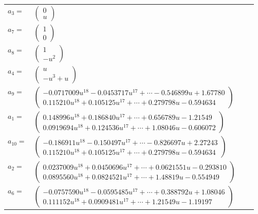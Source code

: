 \documentclass[1p]{elsarticle_modified}
\theoremstyle{definition}
\begin{document}
\begin{tabular}{m{7pt} m{180pt} m{7pt} m{180pt} }
\flushright $a_{3}=$&$\begin{pmatrix}0\\u\end{pmatrix}$ \\
\flushright $a_{7}=$&$\begin{pmatrix}1\\0\end{pmatrix}$ \\
\flushright $a_{8}=$&$\begin{pmatrix}1\\- u^2\end{pmatrix}$ \\
\flushright $a_{4}=$&$\begin{pmatrix}u\\- u^3+u\end{pmatrix}$ \\
\flushright $a_{9}=$&$\begin{pmatrix}-0.0717009 u^{18}-0.0453717 u^{17}+\cdots-0.546899 u+1.67780\\0.115210 u^{18}+0.105125 u^{17}+\cdots+0.279798 u-0.594634\end{pmatrix}$ \\
\flushright $a_{1}=$&$\begin{pmatrix}0.148996 u^{18}+0.186840 u^{17}+\cdots+0.656789 u-1.21549\\0.0919694 u^{18}+0.124536 u^{17}+\cdots+1.08046 u-0.606072\end{pmatrix}$ \\
\flushright $a_{10}=$&$\begin{pmatrix}-0.186911 u^{18}-0.150497 u^{17}+\cdots-0.826697 u+2.27243\\0.115210 u^{18}+0.105125 u^{17}+\cdots+0.279798 u-0.594634\end{pmatrix}$ \\
\flushright $a_{2}=$&$\begin{pmatrix}0.0237009 u^{18}+0.0450696 u^{17}+\cdots+0.0621551 u-0.293810\\0.0895560 u^{18}+0.0824521 u^{17}+\cdots+1.48819 u-0.554949\end{pmatrix}$ \\
\flushright $a_{6}=$&$\begin{pmatrix}-0.0757590 u^{18}-0.0595485 u^{17}+\cdots+0.388792 u+1.08046\\0.111152 u^{18}+0.0909481 u^{17}+\cdots+1.21549 u-1.19197\end{pmatrix}$ \\

\end{tabular}
\end{document}
